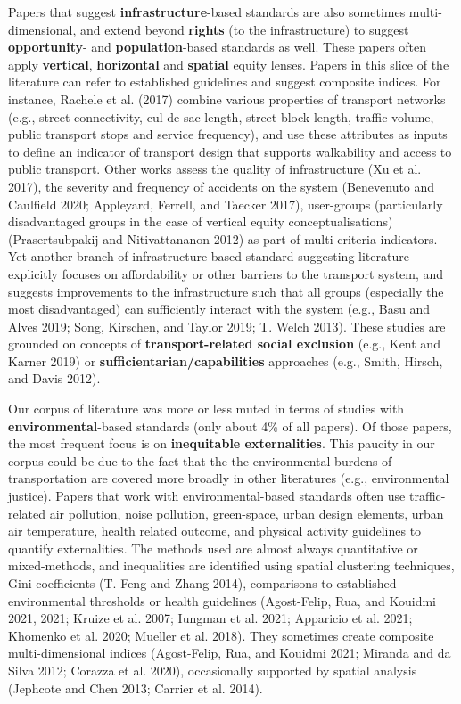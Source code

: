 \documentclass[12pt, oneside]{report}
\begin{document}
Papers that suggest \textbf{infrastructure}-based standards are also
sometimes multi-dimensional, and extend beyond \textbf{rights} (to the
infrastructure) to suggest \textbf{opportunity}- and
\textbf{population}-based standards as well. These papers often apply
\textbf{vertical}, \textbf{horizontal} and \textbf{spatial} equity
lenses. Papers in this slice of the literature can refer to established
guidelines and suggest composite indices. For instance, Rachele et al.
(2017) combine various properties of transport networks (e.g., street
connectivity, cul-de-sac length, street block length, traffic volume,
public transport stops and service frequency), and use these attributes
as inputs to define an indicator of transport design that supports
walkability and access to public transport. Other works assess the
quality of infrastructure (Xu et al. 2017), the severity and frequency
of accidents on the system (Benevenuto and Caulfield 2020; Appleyard,
Ferrell, and Taecker 2017), user-groups (particularly disadvantaged
groups in the case of vertical equity conceptualisations)
(Prasertsubpakij and Nitivattananon 2012) as part of multi-criteria
indicators. Yet another branch of infrastructure-based
standard-suggesting literature explicitly focuses on affordability or
other barriers to the transport system, and suggests improvements to the
infrastructure such that all groups (especially the most disadvantaged)
can sufficiently interact with the system (e.g., Basu and Alves 2019;
Song, Kirschen, and Taylor 2019; T. Welch 2013). These studies are
grounded on concepts of \textbf{transport-related social exclusion}
(e.g., Kent and Karner 2019) or \textbf{sufficientarian/capabilities}
approaches (e.g., Smith, Hirsch, and Davis 2012).

Our corpus of literature was more or less muted in terms of studies with
\textbf{environmental}-based standards (only about 4\% of all papers).
Of those papers, the most frequent focus is on \textbf{inequitable
externalities}. This paucity in our corpus could be due to the fact that
the the environmental burdens of transportation are covered more broadly
in other literatures (e.g., environmental justice). Papers that work
with environmental-based standards often use traffic-related air
pollution, noise pollution, green-space, urban design elements, urban
air temperature, health related outcome, and physical activity
guidelines to quantify externalities. The methods used are almost always
quantitative or mixed-methods, and inequalities are identified using
spatial clustering techniques, Gini coefficients (T. Feng and Zhang
2014), comparisons to established environmental thresholds or health
guidelines (Agost-Felip, Rua, and Kouidmi 2021, 2021; Kruize et al.
2007; Iungman et al. 2021; Apparicio et al. 2021; Khomenko et al. 2020;
Mueller et al. 2018). They sometimes create composite multi-dimensional
indices (Agost-Felip, Rua, and Kouidmi 2021; Miranda and da Silva 2012;
Corazza et al. 2020), occasionally supported by spatial analysis
(Jephcote and Chen 2013; Carrier et al. 2014).
\end{document}
